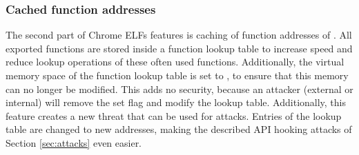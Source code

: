 \subsubsection{Cached function addresses}
The second part of Chrome ELFs features is caching of function addresses of . All exported functions are stored inside a function lookup table to increase speed and reduce lookup operations of these often used functions. Additionally, the virtual memory space of the function lookup table is set to , to ensure that this memory can no longer be modified. This adds no security, because an attacker (external or internal) will remove the set  flag and modify the lookup table. Additionally, this feature creates a new threat that can be used for attacks. Entries of the lookup table are changed to new addresses, making the described \gls{API} hooking attacks of Section \ref{sec:attacks} even easier.